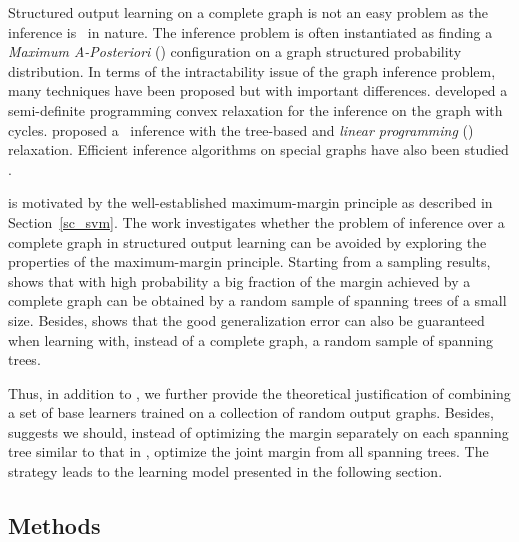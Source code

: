 {Structured output learning on a complete graph is not an easy problem as the inference is \nphard\ in nature.
The inference problem is often instantiated as finding a \textit{Maximum A-Posteriori} (\map) configuration on a graph structured probability distribution.
In terms of the intractability issue of the graph inference problem, many techniques have been proposed but with important differences.
\citet{Jordan04semiefinite} developed a semi-definite programming convex relaxation for the inference on the graph with cycles.
\citet{Wainwright05map} proposed a \map\ inference with the tree-based and \textit{linear programming} (\lp) relaxation.
Efficient inference algorithms on special graphs have also been studied \citep{Globerson07approximate}.

 is motivated by the well-established maximum-margin principle as described in Section~\ref{sc_svm}.
The work investigates whether the problem of inference over a complete graph in structured output learning can be avoided by exploring the properties of the maximum-margin principle.
Starting from a sampling results,  shows that with high probability a big fraction of the margin achieved by a complete graph can be obtained by a random sample of spanning trees of a small size.
Besides,  shows that the good generalization error can also be guaranteed when learning with, instead of a complete graph, a random sample of spanning trees.

Thus, in addition to , we further provide the theoretical justification of combining a set of base learners trained on a collection of random output graphs. 
Besides,  suggests we should, instead of optimizing the margin separately on each spanning tree similar to that in \mam, optimize the joint margin from all spanning trees.
The strategy leads to the learning model presented in the following section.

\subsection{Methods}

}
